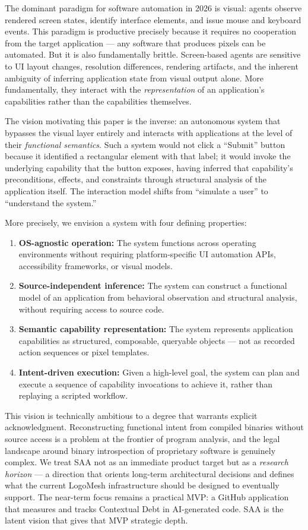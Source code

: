\documentclass[11pt, a4paper]{article}
\begin{document}
The dominant paradigm for software automation in 2026 is visual: agents observe rendered screen states, identify interface elements, and issue mouse and keyboard events. This paradigm is productive precisely because it requires no cooperation from the target application — any software that produces pixels can be automated. But it is also fundamentally brittle. Screen-based agents are sensitive to UI layout changes, resolution differences, rendering artifacts, and the inherent ambiguity of inferring application state from visual output alone. More fundamentally, they interact with the \emph{representation} of an application's capabilities rather than the capabilities themselves.

The vision motivating this paper is the inverse: an autonomous system that bypasses the visual layer entirely and interacts with applications at the level of their \emph{functional semantics}. Such a system would not click a ``Submit'' button because it identified a rectangular element with that label; it would invoke the underlying capability that the button exposes, having inferred that capability's preconditions, effects, and constraints through structural analysis of the application itself. The interaction model shifts from ``simulate a user'' to ``understand the system.''

More precisely, we envision a system with four defining properties:

\begin{enumerate}[leftmargin=*]
  \item \textbf{OS-agnostic operation:} The system functions across operating environments without requiring platform-specific UI automation APIs, accessibility frameworks, or visual models.
  \item \textbf{Source-independent inference:} The system can construct a functional model of an application from behavioral observation and structural analysis, without requiring access to source code.
  \item \textbf{Semantic capability representation:} The system represents application capabilities as structured, composable, queryable objects — not as recorded action sequences or pixel templates.
  \item \textbf{Intent-driven execution:} Given a high-level goal, the system can plan and execute a sequence of capability invocations to achieve it, rather than replaying a scripted workflow.
\end{enumerate}

This vision is technically ambitious to a degree that warrants explicit acknowledgment. Reconstructing functional intent from compiled binaries without source access is a problem at the frontier of program analysis, and the legal landscape around binary introspection of proprietary software is genuinely complex. We treat SAA not as an immediate product target but as a \emph{research horizon} — a direction that orients long-term architectural decisions and defines what the current LogoMesh infrastructure should be designed to eventually support. The near-term focus remains a practical MVP: a GitHub application that measures and tracks Contextual Debt in AI-generated code. SAA is the latent vision that gives that MVP strategic depth.
\end{document}
